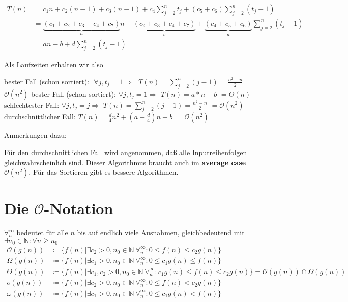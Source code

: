 \documentclass[ngerman,draft,parskip=half*,twoside]{scrreprt}
\theoremstyle{break}
\theoremstyle{nonumberbreak}
\newcommand*{\OO}{\mathcal{O}}      %
\newcommand*{\N}{\mathbb{N}}        %
\begin{document}
\begin{align*}
  T(n) &= c_1 n + c_2(n-1) + c_3(n-1) + c_4\sum_{j=2}^{n}t_j
     + (c_5+c_6)\sum_{j=2}^{n}(t_j-1)\\
  &=\underbrace{(c_1+c_2+c_3+c_4+c_7)}_{a}n -
     \underbrace{(c_2+c_3+c_4+c_7)}_{b} +
     \underbrace{(c_4+c_5+c_6)}_{d}\sum_{j=2}^{n}(t_j-1)\\
  &=  a n-b+d\sum_{j=2}^{n}(t_j-1)
\end{align*}

Als Laufzeiten erhalten wir also
\begin{tabbing}
bester Fall (schon sortiert): \= $ \forall j,t_j=1 \Rightarrow$ \= $T(n)=\sum_{j=2}^{n}(j-1)= \frac {n^2-n}{2}$ \= $\OO(n^2)$ \kill
bester Fall (schon sortiert): \> $ \forall j,t_j=1 \Rightarrow$ \> $T(n)=a*n-b$ \> $=\Theta(n)$ \\ 
schlechtester Fall: \> $ \forall j,t_j=j \Rightarrow$ \> $T(n)=\sum_{j=2}^{n}(j-1)= \frac {n^2-n}{2}$ \> $=\OO(n^2)$\\
durchschnittlicher Fall: \> \> $T(n)=\frac{d}{4}n^2+(a-\frac{d}{4})n-b$ \> $=\OO(n^2)$
\end{tabbing}

 Anmerkungen dazu:

Für den durchschnittlichen Fall wird angenommen, daß alle
Inputreihenfolgen gleichwahrscheinlich sind.
Dieser Algorithmus braucht auch im \textbf{average case} $\OO(n^2)$. Für das Sortieren gibt es
bessere Algorithmen.

\section{Die $\OO$-Notation}
$\forall_n^\infty$ bedeutet für alle $n$ bis auf endlich viele
Ausnahmen, gleichbedeutend mit $\exists n_0 \in \N\colon  \forall n\geq n_0$
\begin{align*}
  \OO(g(n)) &\coloneqq \{ f(n) | \exists c_2 > 0, n_0 \in \N\
  \forall_n^\infty\colon  0\leq f(n)\leq c_2 g(n)\}\\
  \Omega(g(n)) &\coloneqq \{ f(n) | \exists{}c_1 > 0, n_0
  \in\N\ \forall_n^\infty\colon  0\leq c_1 g(n)\leq f(n) 
    \} \\
  \Theta(g(n)) &\coloneqq \{ f(n) | \exists c_1, c_2 > 0, n_0 \in \N\ \forall_n^\infty\colon  c_1 g(n)\leq f(n)\leq c_2 g(n)\} = \OO(g(n)) \cap \Omega(g(n))\\
o(g(n)) &\coloneqq \{ f(n) | \exists c_2 > 0, n_0 \in \N\ \forall_n^\infty\colon  0\leq f(n)< c_2 g(n)\}\\
\omega(g(n)) &\coloneqq \{ f(n) | \exists{}c_1 > 0, n_0 \in  \N\ \forall_n^\infty\colon  0\leq c_1 g(n)< f(n) 
    \}
\end{align*} 
\end{document}
